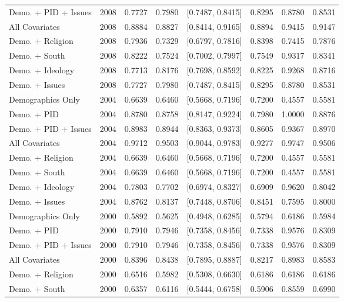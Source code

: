 \begin{longtable}{lrrrlrrr}
  Demo. + PID + Issues & 2008 & 0.7727 & 0.7980 & [0.7487, 0.8415] & 0.8295 & 0.8780 & 0.8531 \\ 
  All Covariates & 2008 & 0.8884 & 0.8827 & [0.8414, 0.9165] & 0.8894 & 0.9415 & 0.9147 \\ 
  Demo. + Religion & 2008 & 0.7936 & 0.7329 & [0.6797, 0.7816] & 0.8398 & 0.7415 & 0.7876 \\ 
  Demo. + South & 2008 & 0.8222 & 0.7524 & [0.7002, 0.7997] & 0.7549 & 0.9317 & 0.8341 \\ 
  Demo. + Ideology & 2008 & 0.7713 & 0.8176 & [0.7698, 0.8592] & 0.8225 & 0.9268 & 0.8716 \\ 
  Demo. + Issues & 2008 & 0.7727 & 0.7980 & [0.7487, 0.8415] & 0.8295 & 0.8780 & 0.8531 \\ 
  Demographics Only & 2004 & 0.6639 & 0.6460 & [0.5668, 0.7196] & 0.7200 & 0.4557 & 0.5581 \\ 
  Demo. + PID & 2004 & 0.8780 & 0.8758 & [0.8147, 0.9224] & 0.7980 & 1.0000 & 0.8876 \\ 
  Demo. + PID + Issues & 2004 & 0.8983 & 0.8944 & [0.8363, 0.9373] & 0.8605 & 0.9367 & 0.8970 \\ 
  All Covariates & 2004 & 0.9712 & 0.9503 & [0.9044, 0.9783] & 0.9277 & 0.9747 & 0.9506 \\ 
  Demo. + Religion & 2004 & 0.6639 & 0.6460 & [0.5668, 0.7196] & 0.7200 & 0.4557 & 0.5581 \\ 
  Demo. + South & 2004 & 0.6639 & 0.6460 & [0.5668, 0.7196] & 0.7200 & 0.4557 & 0.5581 \\ 
  Demo. + Ideology & 2004 & 0.7803 & 0.7702 & [0.6974, 0.8327] & 0.6909 & 0.9620 & 0.8042 \\ 
  Demo. + Issues & 2004 & 0.8762 & 0.8137 & [0.7448, 0.8706] & 0.8451 & 0.7595 & 0.8000 \\ 
  Demographics Only & 2000 & 0.5892 & 0.5625 & [0.4948, 0.6285] & 0.5794 & 0.6186 & 0.5984 \\ 
  Demo. + PID & 2000 & 0.7910 & 0.7946 & [0.7358, 0.8456] & 0.7338 & 0.9576 & 0.8309 \\ 
  Demo. + PID + Issues & 2000 & 0.7910 & 0.7946 & [0.7358, 0.8456] & 0.7338 & 0.9576 & 0.8309 \\ 
  All Covariates & 2000 & 0.8396 & 0.8438 & [0.7895, 0.8887] & 0.8217 & 0.8983 & 0.8583 \\ 
  Demo. + Religion & 2000 & 0.6516 & 0.5982 & [0.5308, 0.6630] & 0.6186 & 0.6186 & 0.6186 \\ 
  Demo. + South & 2000 & 0.6357 & 0.6116 & [0.5444, 0.6758] & 0.5906 & 0.8559 & 0.6990 \\ 

\end{longtable}
